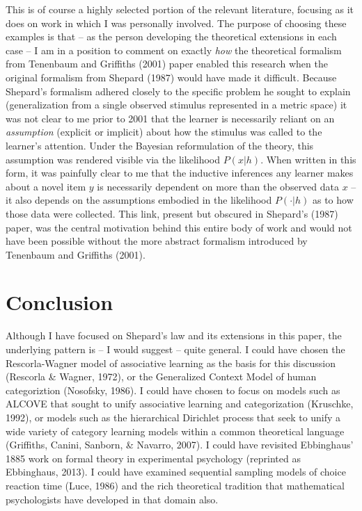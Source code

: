 \documentclass[english,doc]{apa6}
\begin{document}
This is of course a highly selected portion of the relevant literature, focusing as it does on work in which I was personally involved. The purpose of choosing these examples is that -- as the person developing the theoretical extensions in each case -- I am in a position to comment on exactly \emph{how} the theoretical formalism from Tenenbaum and Griffiths (2001) paper enabled this research when the original formalism from Shepard (1987) would have made it difficult. Because Shepard's formalism adhered closely to the specific problem he sought to explain (generalization from a single observed stimulus represented in a metric space) it was not clear to me prior to 2001 that the learner is necessarily reliant on an \emph{assumption} (explicit or implicit) about how the stimulus was called to the learner's attention. Under the Bayesian reformulation of the theory, this assumption was rendered visible via the likelihood \(P(x|h)\). When written in this form, it was painfully clear to me that the inductive inferences any learner makes about a novel item \(y\) is necessarily dependent on more than the observed data \(x\) -- it also depends on the assumptions embodied in the likelihood \(P(\cdot|h)\) as to how those data were collected. This link, present but obscured in Shepard's (1987) paper, was the central motivation behind this entire body of work and would not have been possible without the more abstract formalism introduced by Tenenbaum and Griffiths (2001).

\hypertarget{conclusion}{%
\section{Conclusion}\label{conclusion}}

Although I have focused on Shepard's law and its extensions in this paper, the underlying pattern is -- I would suggest -- quite general. I could have chosen the Rescorla-Wagner model of associative learning as the basis for this discussion (Rescorla \& Wagner, 1972), or the Generalized Context Model of human categoriztion (Nosofsky, 1986). I could have chosen to focus on models such as ALCOVE that sought to unify associative learning and categorization (Kruschke, 1992), or models such as the hierarchical Dirichlet process that seek to unify a wide variety of category learning models within a common theoretical language (Griffiths, Canini, Sanborn, \& Navarro, 2007). I could have revisited Ebbinghaus' 1885 work on formal theory in experimental psychology (reprinted as Ebbinghaus, 2013). I could have examined sequential sampling models of choice reaction time (Luce, 1986) and the rich theoretical tradition that mathematical psychologists have developed in that domain also.
\end{document}

